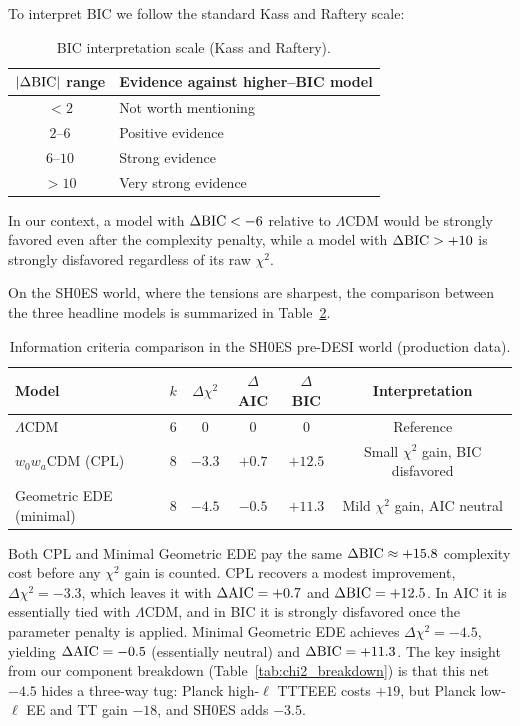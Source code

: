 \documentclass[a4paper,11pt]{article}
\begin{document}
To interpret BIC we follow the standard Kass and Raftery scale:

\begin{table}[h]
\centering
\caption{BIC interpretation scale (Kass and Raftery).}
\label{tab:bic_scale}
\begin{tabular}{cl}
\toprule
$|\Delta{\rm BIC}|$ range & Evidence against higher--BIC model \\
\midrule
$< 2$ & Not worth mentioning \\
$2$--$6$ & Positive evidence \\
$6$--$10$ & Strong evidence \\
$> 10$ & Very strong evidence \\
\bottomrule
\end{tabular}
\end{table}

In our context, a model with $\Delta{\rm BIC} < -6$ relative to $\Lambda$CDM would be strongly favored even after the complexity penalty, while a model with $\Delta{\rm BIC} > +10$ is strongly disfavored regardless of its raw $\chi^2$.

On the SH0ES world, where the tensions are sharpest, the comparison between the three headline models is summarized in Table~\ref{tab:aic_bic}.

\begin{table}[h]
\centering
\caption{Information criteria comparison in the SH0ES pre-DESI world (production data).}
\label{tab:aic_bic}
\begin{tabular}{lccccc}
\toprule
Model & $k$ & $\Delta\chi^2$ & $\Delta$AIC & $\Delta$BIC & Interpretation \\
\midrule
$\Lambda$CDM & 6 & 0 & 0 & 0 & Reference \\
$w_0 w_a$CDM (CPL) & 8 & $-3.3$ & $+0.7$ & $+12.5$ & Small $\chi^2$ gain, BIC disfavored \\
Geometric EDE (minimal) & 8 & $-4.5$ & $-0.5$ & $+11.3$ & Mild $\chi^2$ gain, AIC neutral \\
\bottomrule
\end{tabular}
\end{table}

Both CPL and Minimal Geometric EDE pay the same $\Delta{\rm BIC} \approx +15.8$ complexity cost before any $\chi^2$ gain is counted. CPL recovers a modest improvement, $\Delta\chi^2 = -3.3$, which leaves it with $\Delta{\rm AIC} = +0.7$ and $\Delta{\rm BIC} = +12.5$. In AIC it is essentially tied with $\Lambda$CDM, and in BIC it is strongly disfavored once the parameter penalty is applied. Minimal Geometric EDE achieves $\Delta\chi^2 = -4.5$, yielding $\Delta{\rm AIC} = -0.5$ (essentially neutral) and $\Delta{\rm BIC} = +11.3$. The key insight from our component breakdown (Table~\ref{tab:chi2_breakdown}) is that this net $-4.5$ hides a three-way tug: Planck high-$\ell$ TTTEEE costs $+19$, but Planck low-$\ell$ EE and TT gain $-18$, and SH0ES adds $-3.5$.
\end{document}
